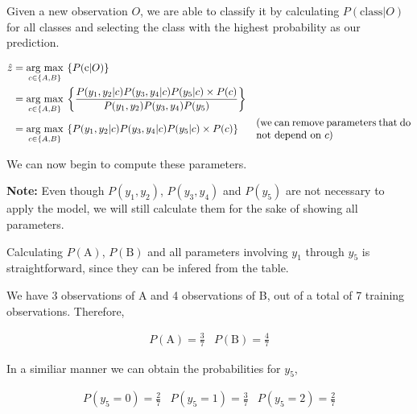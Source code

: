 \documentclass[12pt]{article}
\begin{document}
\begin{enumerate}[leftmargin=\labelsep]
\begin{enumerate}
                Given a new observation $O$, we are able to classify it by calculating $P(\text{class}|O)$ for all classes and selecting the class with the
                highest probability as our prediction.

                \begin{equation}\label{ex1-map}
                  \begin{aligned}
                    \hat{z} & = \underset{c \in \{A, B\}}{\text{arg max}} \medspace \left\{P(\text{c} | O)\right\}                                                                               \\
                            & = \underset{c \in \{A, B\}}{\text{arg max}} \medspace \left\{\frac{P(y_1, y_2 | c) P(y_3, y_4 | c) P(y_5 | c) \times P(c)}{P(y_1, y_2) P(y_3, y_4) P(y_5)}\right\} \\
                            & = \underset{c \in \{A, B\}}{\text{arg max}} \medspace \left\{P(y_1, y_2 | c) P(y_3, y_4 | c) P(y_5 | c) \times P(c)\right\}
                            & \parbox{15em}{(we can remove parameters that do not depend on $c$)}
                  \end{aligned}
                \end{equation}

                We can now begin to compute these parameters.

                \textbf{Note:} Even though $P(y_1, y_2)$, $P(y_3, y_4)$ and $P(y_5)$ are not necessary
                to apply the model, we will still calculate them for the sake of showing
                all parameters.

                Calculating $P(\text{A})$, $P(\text{B})$ and all parameters involving $y_1$ through
                $y_5$ is straightforward, since they can be infered from the table.

                We have 3 observations of A and 4 observations of B, out of a total of 7 training observations.
                Therefore,

                \[
                  \begin{array}{cc}
                    P(\text{A}) = \frac{3}{7} &
                    P(\text{B}) = \frac{4}{7}
                  \end{array}
                \]

                In a similiar manner we can obtain the probabilities for $y_5$,

                \[
                  \begin{array}{ccc}
                    P(y_5 = 0) = \frac{2}{7} &
                    P(y_5 = 1) = \frac{3}{7} &
                    P(y_5 = 2) = \frac{2}{7}
                  \end{array}
                \]


\end{enumerate}
\end{enumerate}
\end{document}
